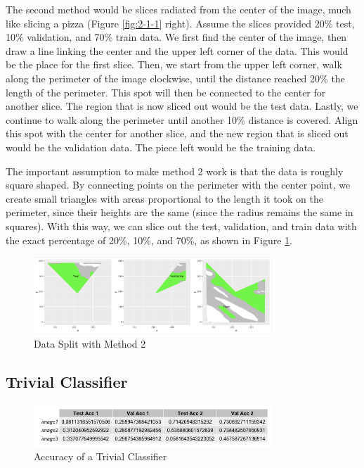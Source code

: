 \documentclass[11pt]{article}
\begin{document}
The second method would be slices radiated from the center of the image, much like slicing a pizza (Figure \ref{fig:2-1-1} right). Assume the slices provided 20\% test, 10\% validation, and 70\% train data. We first find the center of the image, then draw a line linking the center and the upper left corner of the data. This would be the place for the first slice. Then, we start from the upper left corner, walk along the perimeter of the image clockwise, until the distance reached 20\% the length of the perimeter. This spot will then be connected to the center for another slice. The region that is now sliced out would be the test data. Lastly, we continue to walk along the perimeter until another 10\% distance is covered. Align this spot with the center for another slice, and the new region that is sliced out would be the validation data. The piece left would be the training data. 

The important assumption to make method 2 work is that the data is roughly square shaped. By connecting points on the perimeter with the center point, we create small triangles with areas proportional to the length it took on the perimeter, since their heights are the same (since the radius remains the same in squares). With this way, we can slice out the test, validation, and train data with the exact percentage of 20\%, 10\%, and 70\%, as shown in Figure \ref{fig:2-1-3}.

\begin{figure}[h]
\includegraphics[width=0.8\textwidth]{2-1-4.jpeg}
\centering
\caption{Data Split with Method 2}
\label{fig:2-1-3}
\centering
\end{figure}

\subsection{Trivial Classifier}

\begin{figure}[h]
\includegraphics[width=0.8\textwidth]{2-2-1.png}
\centering
\caption{Accuracy of a Trivial Classifier}
\label{fig:2-2-1}
\centering
\end{figure}
\end{document}
